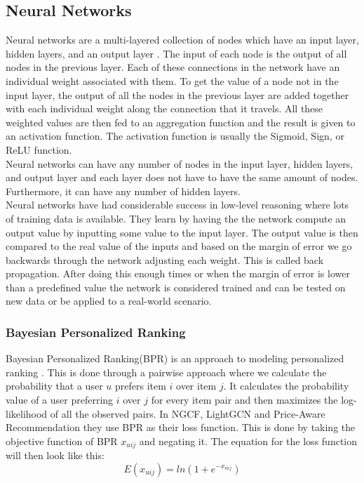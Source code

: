 \subsection{Neural Networks}
Neural networks are a multi-layered collection of nodes which have an input layer, hidden layers, and an output layer \cite{AI-book}.
The input of each node is the output of all nodes in the previous layer.
Each of these connections in the network have an individual weight associated with them.
To get the value of a node not in the input layer, the output of all the nodes in the previous layer are added together with each individual weight along the connection that it travels.
All these weighted values are then fed to an aggregation function and the result is given to an activation function.
The activation function is usually the Sigmoid, Sign, or ReLU function.
\\
Neural networks can have any number of nodes in the input layer, hidden layers, and output layer and each layer does not have to have the same amount of nodes.
Furthermore, it can have any number of hidden layers.
\\
Neural networks have had considerable success in low-level reasoning where lots of training data is available.
They learn by having the the network compute an output value by inputting some value to the input layer.
The output value is then compared to the real value of the inputs and based on the margin of error we go backwards through the network adjusting each weight.
This is called back propagation.
After doing this enough times or when the margin of error is lower than a predefined value the network is considered trained and can be tested on new data or be applied to a real-world scenario.

\subsubsection{Bayesian Personalized Ranking}\label{subsubsec:BPR}
Bayesian Personalized Ranking(BPR) is an approach to modeling personalized ranking \cite{BPR}.
This is done through a pairwise approach where we calculate the probability that a user $u$ prefers item $i$ over item $j$.
It calculates the probability value of a user preferring $i$ over $j$ for every item pair and then maximizes the log-likelihood of all the observed pairs.
In NGCF, LightGCN and Price-Aware Recommendation they use BPR as their loss function.
This is done by taking the objective function of BPR $x_{uij}$ and negating it.
The equation for the loss function will then look like this:
\[E(x_{uij}) = ln(1+e^{-x_{uij}})\]

